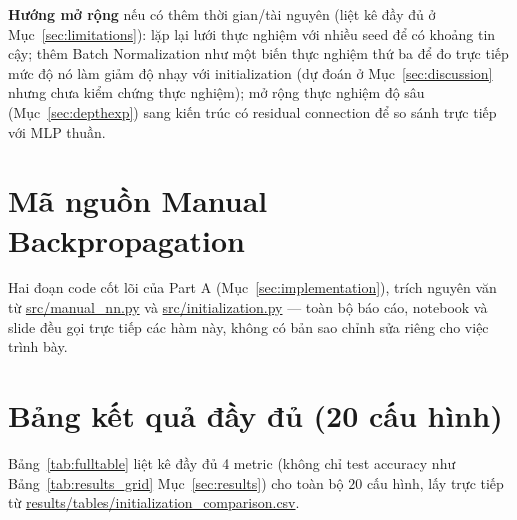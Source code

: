 \documentclass[12pt,a4paper]{article}
\begin{document}
\textbf{Hướng mở rộng} nếu có thêm thời gian/tài nguyên (liệt kê đầy đủ ở
Mục~\ref{sec:limitations}): lặp lại lưới thực nghiệm với nhiều seed để có
khoảng tin cậy; thêm Batch Normalization như một biến thực nghiệm thứ ba
để đo trực tiếp mức độ nó làm giảm độ nhạy với initialization (dự đoán ở
Mục~\ref{sec:discussion} nhưng chưa kiểm chứng thực nghiệm); mở rộng thực
nghiệm độ sâu (Mục~\ref{sec:depthexp}) sang kiến trúc có residual
connection để so sánh trực tiếp với MLP thuần.

{}
{\small }

\appendix

\section{Mã nguồn Manual Backpropagation}
\label{app:code}

Hai đoạn code cốt lõi của Part A (Mục~\ref{sec:implementation}), trích
nguyên văn từ \url{src/manual_nn.py} và \url{src/initialization.py} ---
toàn bộ báo cáo, notebook và slide đều gọi trực tiếp các hàm này, không
có bản sao chỉnh sửa riêng cho việc trình bày.




\section{Bảng kết quả đầy đủ (20 cấu hình)}
\label{app:fulltable}

Bảng~\ref{tab:fulltable} liệt kê đầy đủ 4 metric (không chỉ test accuracy
như Bảng~\ref{tab:results_grid} Mục~\ref{sec:results}) cho toàn bộ $20$
cấu hình, lấy trực tiếp từ \url{results/tables/initialization_comparison.csv}.
\end{document}

